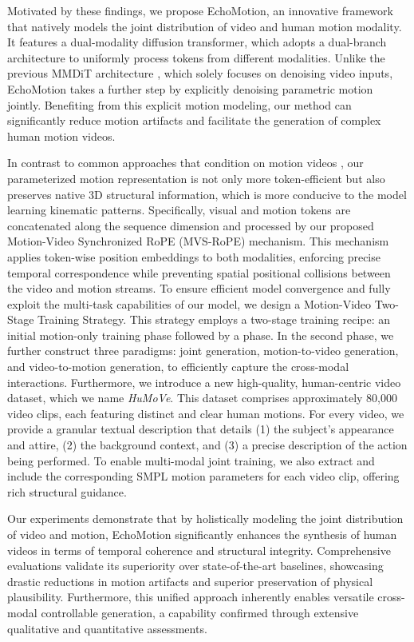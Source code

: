 Motivated by these findings, we propose EchoMotion, an innovative framework that natively models the joint distribution of video and human motion modality.
It features a dual-modality diffusion transformer, which adopts a dual-branch architecture to uniformly process tokens from different modalities. Unlike the previous MMDiT architecture \citep{esser2024scaling}, which solely focuses on denoising video inputs, EchoMotion takes a further step by explicitly denoising parametric motion jointly. 
Benefiting from this explicit motion modeling, our method can significantly reduce motion artifacts and facilitate the generation of complex human motion videos.

In contrast to common approaches that condition on motion videos \citep{zhou2024realisdance, hu2024animate}, our parameterized motion representation is not only more token-efficient but also preserves native 3D structural information, which is more conducive to the model learning kinematic patterns.
Specifically, visual and motion tokens are concatenated along the sequence dimension and processed by our proposed Motion-Video Synchronized RoPE (MVS-RoPE) mechanism. This mechanism applies token-wise position embeddings to both modalities, enforcing precise temporal correspondence while preventing spatial positional collisions between the video and motion streams.
To ensure efficient model convergence and fully exploit the multi-task capabilities of our model, we design a Motion-Video Two-Stage Training Strategy.
This strategy employs a two-stage training recipe: an initial motion-only training phase followed by a  phase. In the second phase, we further construct three paradigms: joint generation, motion-to-video generation, and video-to-motion generation, to efficiently capture the cross-modal interactions. Furthermore, we introduce a new high-quality, human-centric video dataset, which we name \textit{HuMoVe}. This dataset comprises approximately 80,000 video clips, each featuring distinct and clear human motions. For every video, we provide a granular textual description that details (1) the subject's appearance and attire, (2) the background context, and (3) a precise description of the action being performed. To enable multi-modal joint training, we also extract and include the corresponding SMPL motion parameters for each video clip, offering rich structural guidance.


Our experiments demonstrate that by holistically modeling the joint distribution of video and motion, EchoMotion significantly enhances the synthesis of human videos in terms of temporal coherence and structural integrity. Comprehensive evaluations validate its superiority over state-of-the-art baselines, showcasing drastic reductions in motion artifacts and superior preservation of physical plausibility. Furthermore, this unified approach inherently enables versatile cross-modal controllable generation, a capability confirmed through extensive qualitative and quantitative assessments.